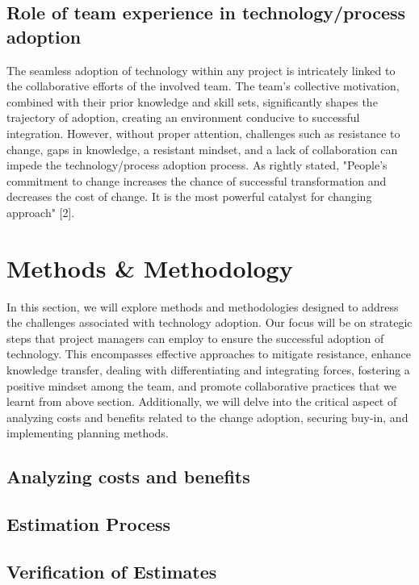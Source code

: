 \documentclass{article}
\begin{document}
\subsection{Role of team experience in technology/process adoption}

The seamless adoption of technology within any project is intricately linked to the collaborative efforts of the involved team. The team's collective motivation, combined with their prior knowledge and skill sets, significantly shapes the trajectory of adoption, creating an environment conducive to successful integration. However, without proper attention, challenges such as resistance to change, gaps in knowledge, a resistant mindset, and a lack of collaboration can impede the technology/process adoption process. As rightly stated, "People's commitment to change increases the chance of successful transformation and decreases the cost of change. It is the most powerful catalyst for changing approach" [2].


\section{Methods \& Methodology}
In this section, we will explore methods and methodologies designed to address the challenges associated with technology adoption. Our focus will be on strategic steps that project managers can employ to ensure the successful adoption of technology. This encompasses effective approaches to mitigate resistance, enhance knowledge transfer, dealing with differentiating and integrating forces, fostering a positive mindset among the team, and promote collaborative practices that we learnt from above section. Additionally, we will delve into the critical aspect of analyzing costs and benefits related to the change adoption, securing buy-in, and implementing planning methods. 


\subsection{Analyzing costs and benefits}
\lipsum[20]

\subsection{Estimation Process}
\lipsum[15]

\subsection{Verification of Estimates}
\lipsum[16]
\end{document}
